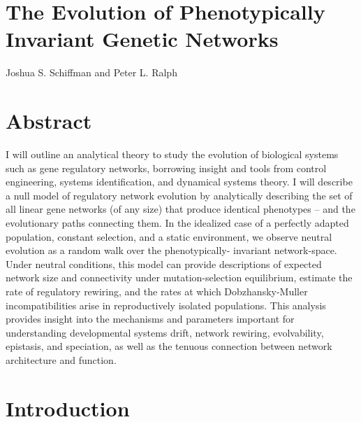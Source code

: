 \documentclass[9 pt]{article}
\newcommand{\1}{\mathbbm{1}}
\begin{document}
\section*{The Evolution of Phenotypically Invariant Genetic Networks}
Joshua S. Schiffman and Peter L. Ralph

\begin{multicols}{2}


\section*{Abstract}
I will outline an analytical theory to study the evolution of biological systems such as gene regulatory networks, borrowing insight and tools from control engineering, systems identification, and dynamical systems theory. I will describe a null model of regulatory network evolution by analytically describing the set of all linear gene networks (of any size) that produce identical phenotypes -- and the evolutionary paths connecting them. In the idealized case of a perfectly adapted population, constant selection, and a static environment, we observe neutral evolution as a random walk over the phenotypically- invariant network-space. Under neutral conditions, this model can provide descriptions of expected network size and connectivity under mutation-selection equilibrium, estimate the rate of regulatory rewiring, and the rates at which Dobzhansky-Muller incompatibilities arise in reproductively isolated populations. This analysis provides insight into the mechanisms and parameters important for understanding developmental systems drift, network rewiring, evolvability, epistasis, and speciation, as well as the tenuous connection between network architecture and function. 

\section*{Introduction}


\end{multicols}
\end{document}
